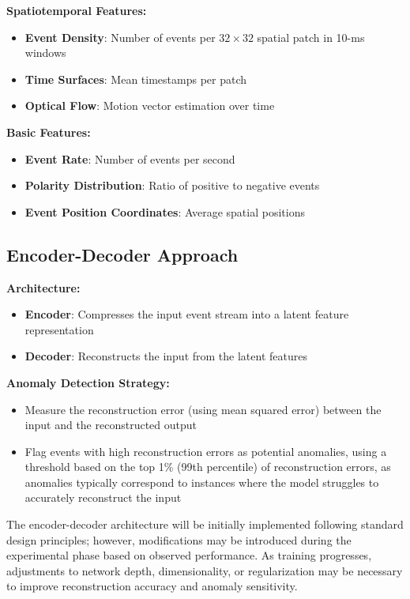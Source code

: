 \documentclass[12pt,a4paper]{article}
\begin{document}
\textbf{Spatiotemporal Features:}
\begin{itemize}
    \item \textbf{Event Density}: Number of events per $32 \times 32$ spatial patch in 10-ms windows
    \item \textbf{Time Surfaces}: Mean timestamps per patch
    \item \textbf{Optical Flow}: Motion vector estimation over time
\end{itemize}

\textbf{Basic Features:}
\begin{itemize}
    \item \textbf{Event Rate}: Number of events per second
    \item \textbf{Polarity Distribution}: Ratio of positive to negative events
    \item \textbf{Event Position Coordinates}: Average spatial positions
\end{itemize}

\subsection{Encoder-Decoder Approach}

\textbf{Architecture:}
\begin{itemize}
    \item \textbf{Encoder}: Compresses the input event stream into a latent feature representation
    \item \textbf{Decoder}: Reconstructs the input from the latent features
\end{itemize}

\textbf{Anomaly Detection Strategy:}
\begin{itemize}
    \item Measure the reconstruction error (using mean squared error) between the input and the reconstructed output
    \item Flag events with high reconstruction errors as potential anomalies, using a threshold based on the top 1\% (99th percentile) of reconstruction errors, as anomalies typically correspond to instances where the model struggles to accurately reconstruct the input
\end{itemize}

The encoder-decoder architecture will be initially implemented following standard design principles; however, modifications may be introduced during the experimental phase based on observed performance. As training progresses, adjustments to network depth, dimensionality, or regularization may be necessary to improve reconstruction accuracy and anomaly sensitivity.
\end{document}
